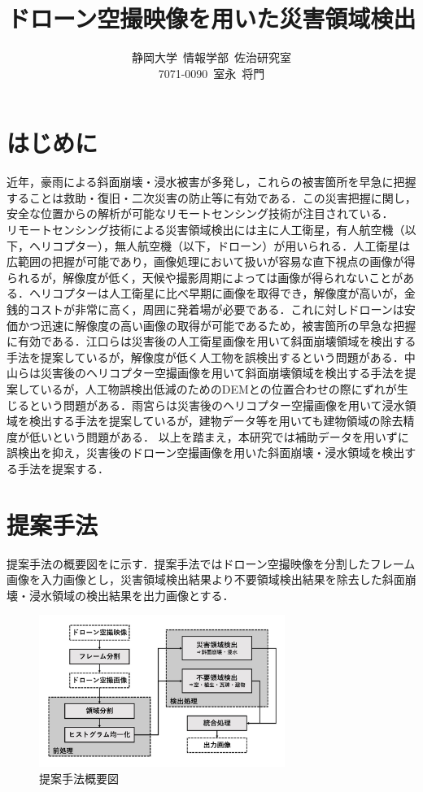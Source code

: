 \documentclass[a4paper, twocolumn, xelatex, 9pt, ja=standard, Ligatures=TeX]{bxjsarticle}
\title{\vspace{-1cm}\LARGE ドローン空撮映像を用いた災害領域検出}
\author{\vspace{-1cm}静岡大学\ 情報学部\ 佐治研究室 \\ 7071-0090\ 室永\ 将門}
\date{}
\begin{document}
	
\maketitle
\section{はじめに}
	近年，豪雨による斜面崩壊・浸水被害が多発し，これらの被害箇所を早急に把握することは救助・復旧・二次災害の防止等に有効である．この災害把握に関し，安全な位置からの解析が可能なリモートセンシング技術が注目されている．\\
	リモートセンシング技術による災害領域検出には主に人工衛星，有人航空機（以下，ヘリコプター），無人航空機（以下，ドローン）が用いられる．人工衛星は広範囲の把握が可能であり，画像処理において扱いが容易な直下視点の画像が得られるが，解像度が低く，天候や撮影周期によっては画像が得られないことがある．ヘリコプターは人工衛星に比べ早期に画像を取得でき，解像度が高いが，金銭的コストが非常に高く，周囲に発着場が必要である．これに対しドローンは安価かつ迅速に解像度の高い画像の取得が可能であるため，被害箇所の早急な把握に有効である．江口ら\cite{art01}は災害後の人工衛星画像を用いて斜面崩壊領域を検出する手法を提案しているが，解像度が低く人工物を誤検出するという問題がある．中山\cite{art02}らは災害後のヘリコプター空撮画像を用いて斜面崩壊領域を検出する手法を提案しているが，人工物誤検出低減のためのDEMとの位置合わせの際にずれが生じるという問題がある．雨宮\cite{art03}らは災害後のヘリコプター空撮画像を用いて浸水領域を検出する手法を提案しているが，建物データ等を用いても建物領域の除去精度が低いという問題がある．
	以上を踏まえ，本研究では補助データを用いずに誤検出を抑え，災害後のドローン空撮画像を用いた斜面崩壊・浸水領域を検出する手法を提案する．

\section{提案手法}
	提案手法の概要図をに示す．提案手法ではドローン空撮映像を分割したフレーム画像を入力画像とし，災害領域検出結果より不要領域検出結果を除去した斜面崩壊・浸水領域の検出結果を出力画像とする．
	
\begin{figure}[b]
	\centering
		\includegraphics[width=8cm]{img/howto.jpg}
		\caption{提案手法概要図}
		\label{img01}
\end{figure}
\end{document}
